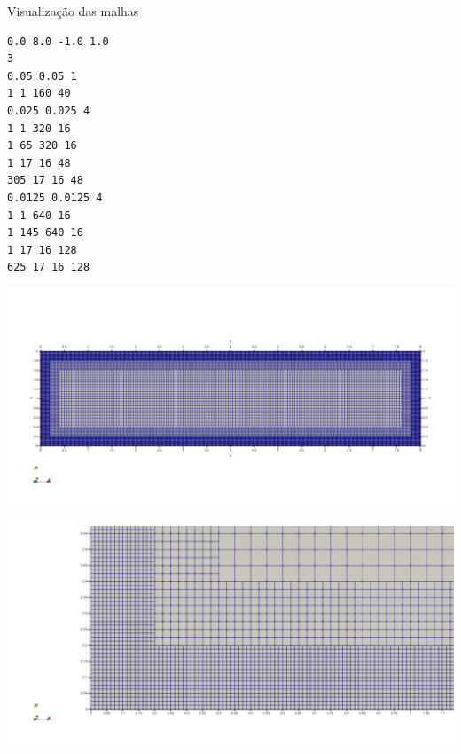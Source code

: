 \documentclass[../main/main.tex]{subfiles}
\begin{document}
\begin{frame}[fragile]{Visualização das malhas}
    \begin{center}
        \begin{minipage}{0.30\textwidth}
            {\footnotesize
                \begin{verbatim}
0.0 8.0 -1.0 1.0
3
0.05 0.05 1
1 1 160 40
0.025 0.025 4
1 1 320 16
1 65 320 16
1 17 16 48
305 17 16 48
0.0125 0.0125 4
1 1 640 16
1 145 640 16
1 17 16 128
625 17 16 128
                \end{verbatim}
            }
        \end{minipage}
        \hfill
        \begin{minipage}{0.65\textwidth}
            \includegraphics[width=\textwidth]{imgs/ref3.png}

            \includegraphics[height=0.3\textheight]{imgs/ref3_border.png}
        \end{minipage}
    \end{center}
\end{frame}
\end{document}
